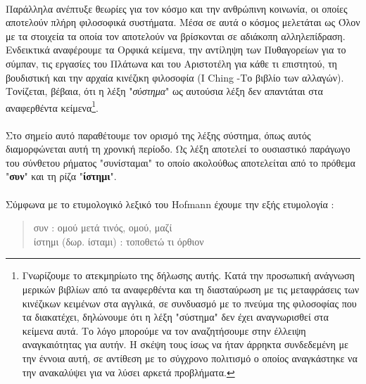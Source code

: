 \documentclass[a4paper,12pt,twoside]{report}
\begin{document}
			\paragraph{}{Παράλληλα ανέπτυξε θεωρίες για τον κόσμο και την ανθρώπινη κοινωνία, οι οποίες αποτελούν πλήρη φιλοσοφικά συστήματα. Μέσα σε αυτά ο κόσμος μελετάται ως Όλον με τα στοιχεία τα οποία τον αποτελούν να βρίσκονται σε αδιάκοπη αλληλεπίδραση. Ενδεικτικά αναφέρουμε τα Ορφικά κείμενα, την αντίληψη των Πυθαγορείων για το σύμπαν, τις εργασίες του Πλάτωνα και του Αριστοτέλη για κάθε τι επιστητού, τη βουδιστική και την αρχαία κινέζικη φιλοσοφία (I Ching -Το βιβλίο των αλλαγών). Τονίζεται, βέβαια, ότι η λέξη "\textit{σύστημα}" ως αυτούσια λέξη δεν απαντάται στα αναφερθέντα κείμενα\footnote{Γνωρίζουμε το ατεκμηρίωτο της δήλωσης αυτής. Κατά την προσωπική ανάγνωση μερικών βιβλίων από τα αναφερθέντα και τη διασταύρωση με τις μεταφράσεις των κινέζικων κειμένων στα αγγλικά, σε συνδυασμό με το πνεύμα της φιλοσοφίας που τα διακατέχει, δηλώνουμε ότι η λέξη "σύστημα" δεν έχει αναγνωρισθεί στα κείμενα αυτά. Το λόγο μπορούμε να τον αναζητήσουμε στην έλλειψη αναγκαιότητας για αυτήν. Η σκέψη τους ίσως να ήταν άρρηκτα συνδεδεμένη με την έννοια αυτή, σε αντίθεση με το σύγχρονο πολιτισμό ο οποίος αναγκάστηκε να την ανακαλύψει για να λύσει αρκετά προβλήματα.}.
			}
			
			\paragraph{}{Στο σημείο αυτό παραθέτουμε τον ορισμό της λέξης σύστημα, όπως αυτός διαμορφώνεται αυτή τη χρονική περίοδο. Ως λέξη αποτελεί το ουσιαστικό παράγωγο του σύνθετου ρήματος "συνίσταμαι" \cite{Dictionary.com} το οποίο ακολούθως αποτελείται από το πρόθεμα "\textbf{συν}" και τη ρίζα "\textbf{ίστημι}".
			}
			\paragraph{}{Σύμφωνα με το ετυμολογικό λεξικό του Hofmann \cite{ΕτυμολογικόΛεξικόΑρχαίαςΕλληνικής} έχουμε την εξής ετυμολογία :
			\begin{quote}
				συν : ομού μετά τινός, ομού, μαζί\\
				ίστημι (δωρ. ίσταμι) : τοποθετώ τι όρθιον
			\end{quote}
			}
\end{document}
